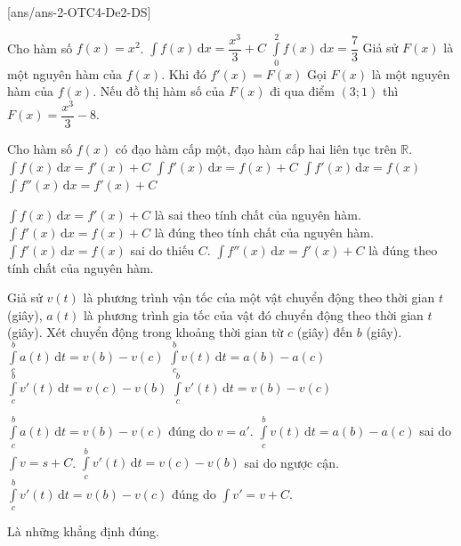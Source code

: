 \cauds
{}[ans/ans-2-OTC4-De2-DS]
\begin{ex}%
	Cho hàm số $f(x)=x^2$. 
	\choiceTF
	{\True $\displaystyle\int f(x)\mathrm{\,d}x=\dfrac{x^3}{3}+C$}
	{$\displaystyle\int\limits_0^2 f(x)\mathrm{\,d}x=\dfrac{7}{3}$}
	{Giả sử $F(x)$ là một nguyên hàm của $f(x)$. Khi đó $f'(x)=F(x)$}
	{\True Gọi $F(x)$ là một nguyên hàm của $f(x)$. Nếu đồ thị hàm số của $F(x)$ đi qua điểm $(3;1)$ thì $F(x)=\dfrac{x^3}{3}-8$.}
\end{ex}
\begin{ex}%
	Cho hàm số $f(x)$ có đạo hàm cấp một, đạo hàm cấp hai liên tục trên $\mathbb{R}$.
	\choiceTF
	{$\displaystyle\int f(x) {\,\mathrm{d}}x =f'(x)+C$}
	{\True $\displaystyle\int f'(x) {\,\mathrm{d}}x =f(x)+C$}
	{$\displaystyle\int f'(x) {\,\mathrm{d}}x =f(x)$}
	{\True $\displaystyle\int f''(x) {\,\mathrm{d}}x =f'(x)+C$}
	\loigiai
	{
		\begin{itemchoice}
		\itemch $\displaystyle\int f(x) {\,\mathrm{d}}x =f'(x)+C$ là sai theo tính chất của nguyên hàm.
		\itemch $\displaystyle\int f'(x) {\,\mathrm{d}}x =f(x)+C$ là đúng theo tính chất của nguyên hàm.
		\itemch $\displaystyle\int f'(x) {\,\mathrm{d}}x =f(x)$ sai do thiếu $C$.
		\itemch $\displaystyle\int f''(x) {\,\mathrm{d}}x =f'(x)+C$ là đúng theo tính chất của nguyên hàm.
		\end{itemchoice}
		
	}
\end{ex}
\begin{ex}%
	Giả sử $v(t)$ là phương trình vận tốc của một vật chuyển động theo thời gian $t$ (giây), $a(t)$ là phương trình gia tốc của vật đó chuyển động theo thời gian $t$ (giây). Xét chuyển động trong khoảng thời gian từ $c$ (giây) đến $b$ (giây).
	\choiceTF
	{\True $\displaystyle\int\limits_c^b a(t)\mathrm{\,d}t=v(b)-v(c)$}
	{$\displaystyle\int\limits_c^b v(t)\mathrm{\,d}t=a(b)-a(c)$}
	{$\displaystyle\int\limits_c^b v'(t)\mathrm{\,d}t=v(c)-v(b)$}
	{\True $\displaystyle\int\limits_c^b v'(t)\mathrm{\,d}t=v(b)-v(c)$}
	\loigiai
	{
		\begin{itemchoice}
		\itemch $\displaystyle\int\limits_c^b a(t)\mathrm{\,d}t=v(b)-v(c)$ đúng do $v=a'$.
		\itemch $\displaystyle\int\limits_c^b v(t)\mathrm{\,d}t=a(b)-a(c)$ sai do $\displaystyle\int v = s+C$.
		\itemch $\displaystyle\int\limits_c^b v'(t)\mathrm{\,d}t=v(c)-v(b)$ sai do ngược cận.
		\itemch $\displaystyle\int\limits_c^b v'(t)\mathrm{\,d}t=v(b)-v(c)$ đúng do $\displaystyle\int v' = v+C$.
		\end{itemchoice}
		Là những khẳng định đúng.
	}
\end{ex}
